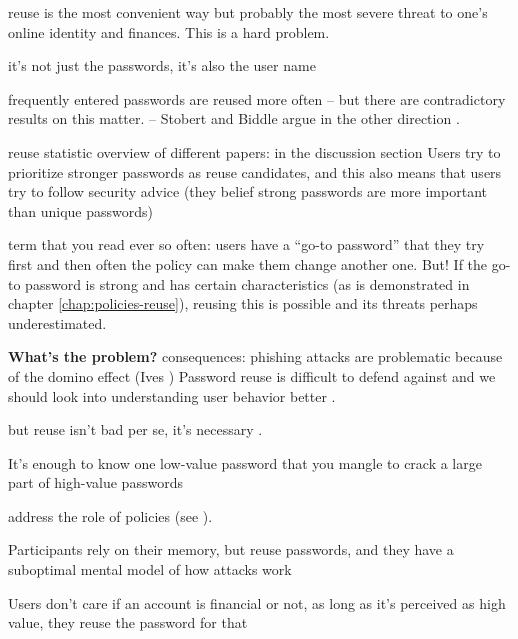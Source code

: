 	reuse is the most convenient way but probably the most severe threat to one's online identity and finances. This is a hard problem. 
	
	it's not just the passwords, it's also the user name 
	
	frequently entered passwords are reused more often \cite{Wash2016UnderstandingPasswordChoices} -- but there are contradictory results on this matter. -- Stobert and Biddle argue in the other direction \cite{Stobert2014PasswordLifeCycle}. 
	
	reuse statistic overview of different papers: 
	\cite{Wash2016UnderstandingPasswordChoices} in the discussion section
	Users try to prioritize stronger passwords as reuse candidates, and this also means that users try to follow security advice (they belief strong passwords are more important than unique passwords) \cite{Wash2016UnderstandingPasswordChoices}
	
	term that you read ever so often: users have a ``go-to password'' that they try first
	and then often the policy can make them change another one. But! If the go-to password is strong and has certain characteristics (as is demonstrated in chapter \ref{chap:policies-reuse}), reusing this is possible and its threats perhaps underestimated. 
	
	\textbf{What's the problem?}
	consequences: phishing attacks are problematic because of the domino effect (Ives \etal) Password reuse is difficult to defend against and we should look into understanding user behavior better \cite{Ives2004DominoEffectReuse}.
	
	but reuse isn't bad per se, it's necessary \cite{Florencio2014PasswordPortfoliosFiniteUser, ZhangKennedy2016RevisitingPasswordRules}. 
	

	
	
	It's enough to know one low-value password that you mangle to crack a large part of high-value passwords \cite{Haque2014Hierarchy}
	
	
	address the role of policies (see \cite{Seitz2017PoliciesReuse}).
	
	Participants rely on their memory, but reuse passwords, and they have a suboptimal mental model of how attacks work \cite{Gaw2006PasswordManagement}
	
	Users don't care if an account is financial or not, as long as it's perceived as high value, they reuse the password for that \cite{Bailey2014StatisticsReuse}
	
